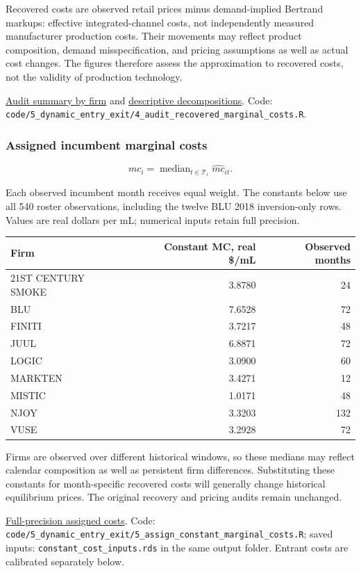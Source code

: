 \documentclass[10pt,]{article}
\begin{document}
Recovered costs are observed retail prices minus demand-implied Bertrand
markups: effective integrated-channel costs, not independently measured
manufacturer production costs. Their movements may reflect product
composition, demand misspecification, and pricing assumptions as well as
actual cost changes. The figures therefore assess the approximation to
recovered costs, not the validity of production technology.

\href{../../output/dynamic_entry_exit/marginal_cost_audit_2026-11-03/firm_cost_summary.csv}{Audit
summary by firm} and
\href{../../output/dynamic_entry_exit/marginal_cost_audit_2026-11-03/descriptive_decomposition.csv}{descriptive
decompositions}. Code:
\texttt{code/5\_dynamic\_entry\_exit/4\_audit\_recovered\_marginal\_costs.R}.

\subsubsection{Assigned incumbent marginal
costs}\label{assigned-incumbent-marginal-costs}

\[
mc_i = \operatorname{median}_{t\in\mathcal{T}_i}\widehat{mc}_{it}.
\]

Each observed incumbent month receives equal weight. The constants below
use all 540 roster observations, including the twelve BLU 2018
inversion-only rows. Values are real dollars per mL; numerical inputs
retain full precision.

\begin{longtable}[]{@{}lrr@{}}
\toprule
Firm & Constant MC, real \$/mL & Observed months\tabularnewline
\midrule
\endhead
21ST CENTURY SMOKE & 3.8780 & 24\tabularnewline
BLU & 7.6528 & 72\tabularnewline
FINITI & 3.7217 & 48\tabularnewline
JUUL & 6.8871 & 72\tabularnewline
LOGIC & 3.0900 & 60\tabularnewline
MARKTEN & 3.4271 & 12\tabularnewline
MISTIC & 1.0171 & 48\tabularnewline
NJOY & 3.3203 & 132\tabularnewline
VUSE & 3.2928 & 72\tabularnewline
\bottomrule
\end{longtable}

Firms are observed over different historical windows, so these medians
may reflect calendar composition as well as persistent firm differences.
Substituting these constants for month-specific recovered costs will
generally change historical equilibrium prices. The original recovery
and pricing audits remain unchanged.

\href{../../output/dynamic_entry_exit/constant_marginal_costs_2026-11-03/incumbent_constant_marginal_costs.csv}{Full-precision
assigned costs}. Code:
\texttt{code/5\_dynamic\_entry\_exit/5\_assign\_constant\_marginal\_costs.R};
saved inputs: \texttt{constant\_cost\_inputs.rds} in the same output
folder. Entrant costs are calibrated separately below.
\end{document}

